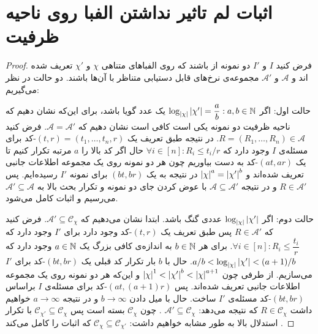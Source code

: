 \chapter{اثبات لم تاثیر نداشتن الفبا روی ناحیه ظرفیت}
\label{appendix:l1}

\begin{proof}
	فرض کنید
	$I$
	و
	$I'$
	دو نمونه از 
	\icod
	باشند که روی الفباهای متناهی
	$\chi$
	و
	$\chi'$
	تعریف شده اند و
	$\mathscr{A}$
	و
	$ \mathscr{A}'$
	مجموعه‌ی نرخ‌های قابل دستیابی متناظر با آن‌ها باشند.
	دو حالت در نظر می‌گیریم:
	
	حالت اول: اگر
	$\log_{\left|{\chi}\right|} \left|{\chi'}\right| = \dfrac{a}{b}: a, b \in \mathbb{N}$
	یک عدد گویا باشد، برای این‌که نشان دهیم که ناحیه ظرفیت دو نمونه یکی است کافی است نشان دهیم که
	$\mathscr{A} = \mathscr{A}'$.
 فرض کنید
	$R = (R_1, \ldots, R_n) \in \mathscr{A}$.
 در نتیجه طبق تعریف یک 
	$(t, r) = (t_1, \ldots, t_n, r)$-کد
	برای مسئله‌ی
	$I$
	وجود دارد که
	$\forall i \in [n]: R_i \leq t_i / r$
	حال اگر کد بالا را
	$a$
	مرتبه تکرار کنیم تا یک
	$(at, ar)$-کد
	به دست بیاوریم چون هر دو نمونه روی یک مجموعه اطلاعات جانبی تعریف شده‌اند و 
	$\left|{\chi}\right|^a = \left|{\chi'}\right|^b$
	در نتیجه به یک
	$(bt, br)$
	برای نمونه
	$I'$
	رسیده‌ایم. پس
	$R \in \mathscr{A}'$
	و در نتیجه
	$\mathscr{A} \subseteq \mathscr{A}'$
	با عوض کردن جای دو نمونه و تکرار بحث بالا به
		$\mathscr{A}' \subseteq \mathscr{A}$
		می‌رسیم و اثبات کامل می‌شود.
		
		حالت دوم: اگر
		$\log_{\left|{\chi}\right|} \left|{\chi'}\right| $
		عددی گنگ باشد. ابتدا نشان می‌دهیم که
		$\mathscr{A}' \subseteq \mathscr{C}_{\chi}$.
  فرض کنید که
		$R \in \mathscr{A}'$
		پس طبق تعریف یک
		$(t, r)$-کد
		وجود دارد برای
		$I'$
		وجود دارد که
		$\forall i \in [n]: R_i \leq \dfrac{t_i}{r}$.
  برای هر
		$b \in \mathbb{N}$
		به اندازه‌ی کافی بزرگ یک
		$a \in \mathbb{N}$
		وجود دارد که
		$a/b < \log_{\left|{\chi}\right|} \left|{\chi'}\right| < (a+1)/b$.
  حال با
		$b$
		بار تکرار کد قبلی یک 
		$(bt, br)$-کد
		برای
		$I'$
		می‌سازیم. از طرفی چون
		$\left|{\chi}\right|^1 < \left|{\chi'}\right|^b < \left|{\chi}\right|^{a + 1}$
		و این‌که هر دو نمونه روی یک مجموعه اطلاعات جانبی تعریف شده‌اند. پس
		$(at, (a+1)r)$-کد
		برای مسئله‌ی
		$I$
		براساس
		$(bt, br)$-کد
		 مسئله‌ی
		 $I'$
		 ساخت. حال با میل دادن
		 $b \rightarrow \infty$
		 و در نتیجه
		 $a \rightarrow \infty$
		 خواهیم داشت
		 $R \in \mathscr{C}_{\chi}$
		  که نتیجه می‌دهد:
		  $\mathscr{A}' \subseteq \mathscr{C}_{\chi}$
		  . چون
		  $\mathscr{C}_{\chi}$
		  بسته است پس
		  $\mathscr{C}_{\chi'} \subseteq \mathscr{C}_{\chi}$
		  با تکرار استدلال بالا به طور مشابه خواهیم داشت:
		  $\mathscr{C}_{\chi} \subseteq \mathscr{C}_{\chi'}$
		  که اثبات را کامل می‌کند \cite{fatemehbook}.
\end{proof}

